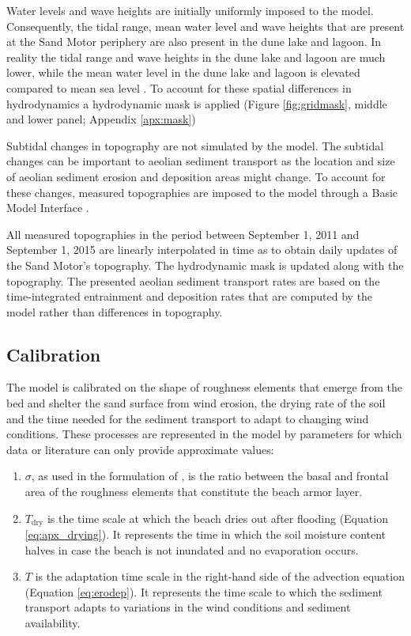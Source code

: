 Water levels and wave heights are initially uniformly imposed to the
model. Consequently, the tidal range, mean water level and wave
heights that are present at the Sand Motor periphery are also present
in the dune lake and lagoon. In reality the tidal range and wave
heights in the dune lake and lagoon are much lower, while the mean
water level in the dune lake and lagoon is elevated compared to mean
sea level \citep{deVries2015}. To account for these spatial
differences in hydrodynamics a hydrodynamic mask is applied (Figure
\ref{fig:gridmask}, middle and lower panel; Appendix \ref{apx:mask})

Subtidal changes in topography are not simulated by the model. The
subtidal changes can be important to aeolian sediment transport as the
location and size of aeolian sediment erosion and deposition areas
might change. To account for these changes, measured topographies are
imposed to the model through a Basic Model Interface
\citep[BMI,][Appendix \ref{apx:bmi}]{Peckham2013}.

All measured topographies in the period between September 1, 2011 and
September 1, 2015 are linearly interpolated in time as to obtain daily
updates of the Sand Motor's topography. The hydrodynamic mask is
updated along with the topography. The presented aeolian sediment
transport rates are based on the time-integrated entrainment and
deposition rates that are computed by the model rather than
differences in topography.

\subsection{Calibration}

The model is calibrated on the shape of roughness elements that emerge
from the bed and shelter the sand surface from wind erosion, the
drying rate of the soil and the time needed for the sediment transport
to adapt to changing wind conditions. These processes are represented
in the model by parameters for which data or literature can only
provide approximate values:

\begin{enumerate}
\item $\sigma$, as used in the formulation of \citet[][Equation
  \ref{eq:raupach}]{Raupach1993}, is the ratio between the basal and
  frontal area of the roughness elements that constitute the beach
  armor layer.
\item $T_{\mathrm{dry}}$ is the time scale at which the beach dries
  out after flooding (Equation \ref{eq:apx_drying}). It represents the
  time in which the soil moisture content halves in case the beach is
  not inundated and no evaporation occurs.
\item $T$ is the adaptation time scale in the right-hand side of the
  advection equation (Equation \ref{eq:erodep}). It represents the
  time scale to which the sediment transport adapts to variations in
  the wind conditions and sediment availability.
\end{enumerate}

